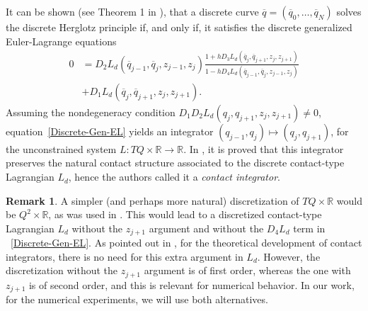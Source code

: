 \documentclass{aims}
\numberwithin{equation}{section}
\theoremstyle{definition}
\newtheorem{remark}[theorem]{Remark}
\begin{document}
It can be shown (see Theorem 1 in \cite{vermeeren2019contact}), that a discrete curve $\overline{q} = (\overline{q}_0, \ldots, \overline{q}_N)$ solves the discrete Herglotz principle if, and only if, it satisfies the discrete generalized Euler-Lagrange equations
\begin{equation} \label{Discrete-Gen-EL}
    \begin{split}
        0 &= D_2L_d(\overline{q}_{j-1}, \overline{q}_j, z_{j-1}, z_j)\frac{1+hD_3L_d(\overline{q}_j, \overline{q}_{j+1}, z_j, z_{j+1})}{1-hD_4L_d(\overline{q}_{j-1}, \overline{q}_j, z_{j-1}, z_j)}\\
        &+ D_1L_d(\overline{q}_j, \overline{q}_{j+1}, z_j, z_{j+1}).
    \end{split}
\end{equation}
Assuming the nondegeneracy condition $D_1 D_2 L_d(q_j, q_{j+1}, z_j, z_{j+1}) \neq 0$, equation~\eqref{Discrete-Gen-EL} yields an integrator $(q_{j-1}, q_j) \mapsto (q_{j}, q_{j+1})$, for the unconstrained system $L\colon TQ\times \mathbb{R}\to \mathbb{R}$. In \cite{vermeeren2019contact}, it is proved that this integrator preserves the natural contact structure associated to the  {discrete contact-type} Lagrangian $L_d$, hence the authors called it a {\it contact integrator}.
 {\begin{remark}\label{rem:order-discretization}
A simpler (and perhaps more natural) discretization of $TQ\times \mathbb{R}$ would be $Q^2\times\mathbb{R}$, as was used in \cite{anahory2021geometry}. This would lead to a discretized contact-type Lagrangian $L_d$ without the $z_{j+1}$ argument and without the $D_4L_d$ term in ~\eqref{Discrete-Gen-EL}. As pointed out in \cite{vermeeren2019contact}, for the theoretical development of contact integrators, there is no need for this extra argument in $L_d$. However, the discretization without the $z_{j+1}$ argument is of first order, whereas the one with  $z_{j+1}$ is of second order, and this is relevant for numerical behavior. In our work, for the numerical experiments, we will use both alternatives.
\end{remark}}
\end{document}
